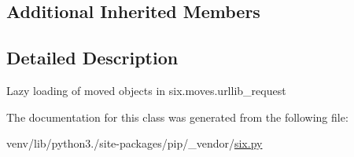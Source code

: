 \subsection*{Additional Inherited Members}


\subsection{Detailed Description}
\begin{DoxyVerb}Lazy loading of moved objects in six.moves.urllib_request\end{DoxyVerb}
 

The documentation for this class was generated from the following file\+:\begin{DoxyCompactItemize}
\item 
venv/lib/python3./site-\/packages/pip/\+\_\+vendor/\hyperlink{pip_2__vendor_2six_8py}{six.\+py}\end{DoxyCompactItemize}
